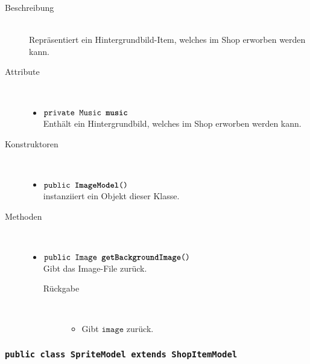 \begin{description}
\item[Beschreibung] \hfill \\ Repräsentiert ein Hintergrundbild-Item, welches im Shop erworben werden kann.

\item[Attribute] \hfill \\
	\vspace{-.8cm}
	\begin{itemize}
		\item $\texttt{private Music \textbf{music}}$ \\ Enthält ein Hintergrundbild, welches im Shop erworben werden kann.

		\end{itemize}
	
\item[Konstruktoren] \hfill \\
	\vspace{-.8cm}
	\begin{itemize}
		\item $\texttt{public \textbf{ImageModel}()}$ \\ instanziiert ein Objekt dieser Klasse.

	\end{itemize}
	
\item[Methoden] \hfill \\
	\vspace{-.8cm}
	\begin{itemize}
		\item $\texttt{public Image \textbf{getBackgroundImage}()}$ \\ Gibt das Image-File zurück.
		\begin{description}
			\item[Rückgabe] \hfill \\
			\vspace{-.8cm}
			\begin{itemize}
				\item Gibt $\texttt{image}$ zurück.
			\end{itemize}
			\end{description}
		
	\end{itemize}
\end{description}


\subsubsection{\normalfont \texttt{public class \textbf{SpriteModel} extends ShopItemModel}}

